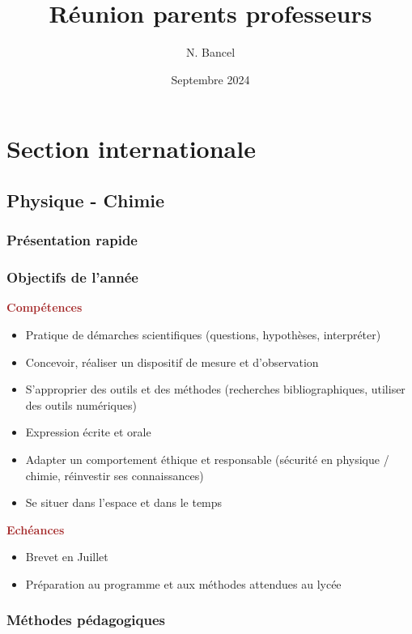 \documentclass[a4paper,12pt]{article}
\begin{document}
\title{Réunion parents professeurs}
\author{N. Bancel}
\date{Septembre 2024}
\maketitle

\section{Section internationale}

\subsection*{Physique - Chimie}

\subsubsection*{Présentation rapide}

\subsubsection*{Objectifs de l'année}

\textcolor{brown}{\textbf{Compétences}}

\begin{itemize}[noitemsep]
\item Pratique de démarches scientifiques (questions, hypothèses, interpréter)
\item Concevoir, réaliser un dispositif de mesure et d'observation
\item S'approprier des outils et des méthodes (recherches bibliographiques, utiliser des outils numériques)
\item Expression écrite et orale 
\item Adapter un comportement éthique et responsable (sécurité en physique / chimie, réinvestir ses connaissances)
\item Se situer dans l'espace et dans le temps
\end{itemize}

\textcolor{brown}{\textbf{Echéances}}

\begin{itemize}[noitemsep]
  \item Brevet en Juillet
  \item Préparation au programme et aux méthodes attendues au lycée
\end{itemize}


\subsubsection*{Méthodes pédagogiques}
\end{document}
